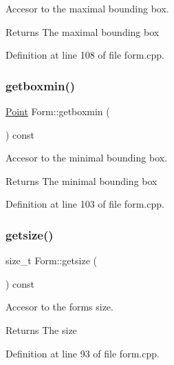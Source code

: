 Accesor to the maximal bounding box. 

\begin{DoxyReturn}{Returns}
The maximal bounding box 
\end{DoxyReturn}


Definition at line 108 of file form.\+cpp.

\hypertarget{class_form_a19ec5bfe99ab4266e549ace55a82ea9f}{}\label{class_form_a19ec5bfe99ab4266e549ace55a82ea9f} 
\subsubsection{\texorpdfstring{getboxmin()}{getboxmin()}}
{\footnotesize\ttfamily \hyperlink{struct_point}{Point} Form\+::getboxmin (\begin{DoxyParamCaption}{ }\end{DoxyParamCaption}) const}



Accesor to the minimal bounding box. 

\begin{DoxyReturn}{Returns}
The minimal bounding box 
\end{DoxyReturn}


Definition at line 103 of file form.\+cpp.

\hypertarget{class_form_a59a8c1139f5f0efee5a483aea004b421}{}\label{class_form_a59a8c1139f5f0efee5a483aea004b421} 
\subsubsection{\texorpdfstring{getsize()}{getsize()}}
{\footnotesize\ttfamily size\+\_\+t Form\+::getsize (\begin{DoxyParamCaption}{ }\end{DoxyParamCaption}) const}



Accesor to the form\textquotesingle{}s size. 

\begin{DoxyReturn}{Returns}
The size 
\end{DoxyReturn}


Definition at line 93 of file form.\+cpp.

\hypertarget{class_form_a64ed9c18068eeaac328572a4f42f0a1f}{}\label{class_form_a64ed9c18068eeaac328572a4f42f0a1f} 
